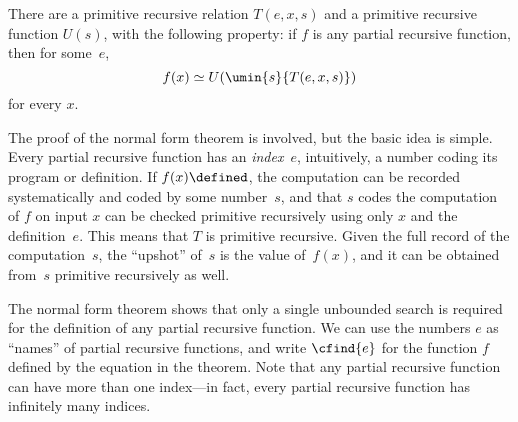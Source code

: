 \documentclass[../../include/open-logic-section]{subfiles}
\begin{document}

\begin{thm}
There are a primitive recursive relation $T(e, x, s)$ and a primitive
recursive function $U(s)$, with the following property: if $f$ is any
partial recursive function, then for some~$e$,
\[
f(x) \simeq U(\umin{s}{T(e, x, s)})
\]
for every $x$. 
\end{thm}

\begin{explain}
The proof of the normal form theorem is involved, but the basic idea
is simple.  Every partial recursive function has an \emph{index}~$e$,
intuitively, a number coding its program or definition.  If $f(x)
\defined$, the computation can be recorded systematically and coded by
some number~$s$, and that $s$ codes the computation of $f$ on input
$x$ can be checked primitive recursively using only $x$ and the
definition~$e$.  This means that $T$ is primitive recursive.  Given
the full record of the computation~$s$, the ``upshot'' of~$s$ is the
value of~$f(x)$, and it can be obtained from~$s$ primitive recursively
as well.

The normal form theorem shows that only a single unbounded search is
required for the definition of any partial recursive function.  We can
use the numbers $e$ as ``names'' of partial recursive functions, and
write $\cfind{e}$ for the function $f$ defined by the equation in the
theorem.  Note that any partial recursive function can have more than
one index---in fact, every partial recursive function has infinitely
many indices.  
\end{explain}
\end{document}

